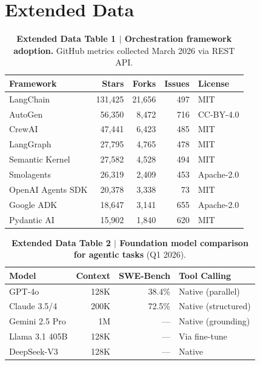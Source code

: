 \documentclass[10pt]{article}
\begin{document}
\newpage
\section*{Extended Data}

\begin{table}[ht]
\centering
\caption*{\textbf{Extended Data Table 1 $|$ Orchestration framework adoption.} GitHub metrics collected March 2026 via REST API.}
\begin{tabular}{lrrrl}
\toprule
\textbf{Framework} & \textbf{Stars} & \textbf{Forks} & \textbf{Issues} & \textbf{License} \\
\midrule
LangChain        & 131,425 & 21,656 & 497  & MIT \\
AutoGen          & 56,350  & 8,472  & 716  & CC-BY-4.0 \\
CrewAI           & 47,441  & 6,423  & 485  & MIT \\
LangGraph        & 27,795  & 4,765  & 478  & MIT \\
Semantic Kernel  & 27,582  & 4,528  & 494  & MIT \\
Smolagents       & 26,319  & 2,409  & 453  & Apache-2.0 \\
OpenAI Agents SDK& 20,378  & 3,338  & 73   & MIT \\
Google ADK       & 18,647  & 3,141  & 655  & Apache-2.0 \\
Pydantic AI      & 15,902  & 1,840  & 620  & MIT \\
\bottomrule
\end{tabular}
\end{table}

\begin{table}[ht]
\centering
\caption*{\textbf{Extended Data Table 2 $|$ Foundation model comparison for agentic tasks} (Q1 2026).}
\begin{tabular}{lrrl}
\toprule
\textbf{Model} & \textbf{Context} & \textbf{SWE-Bench} & \textbf{Tool Calling} \\
\midrule
GPT-4o          & 128K   & 38.4\%  & Native (parallel) \\
Claude 3.5/4    & 200K   & 72.5\%  & Native (structured) \\
Gemini 2.5 Pro  & 1M     & ---     & Native (grounding) \\
Llama 3.1 405B  & 128K   & ---     & Via fine-tune \\
DeepSeek-V3     & 128K   & ---     & Native \\
\bottomrule
\end{tabular}
\end{table}
\end{document}
